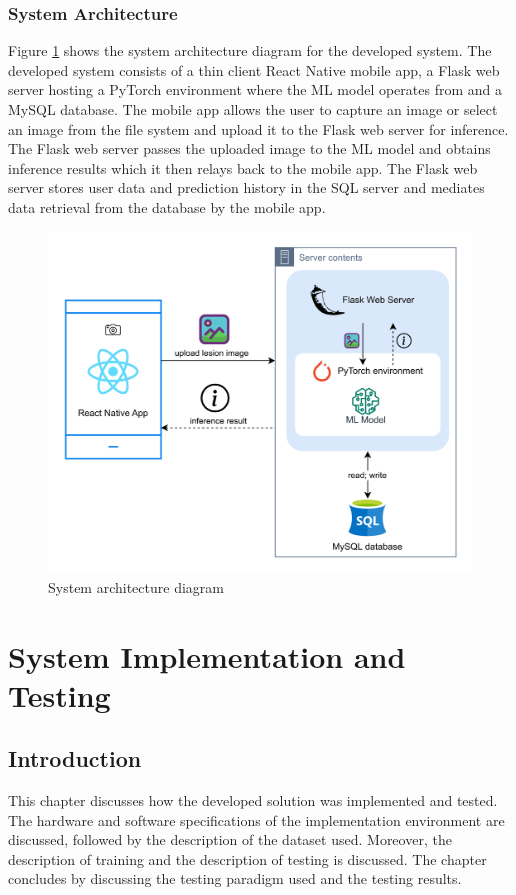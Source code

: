 \documentclass[12pt, a4paper]{article}
\begin{document}
\subsubsection{System Architecture}
Figure \ref{fig:arch-diagram} shows the system architecture diagram for the developed system. The developed system consists of a thin client React Native mobile app, a Flask web server hosting a PyTorch environment where the ML model operates from and a MySQL database. The mobile app allows the user to capture an image or select an image from the file system and upload it to the Flask web server for inference. The Flask web server passes the uploaded image to the ML model and obtains inference results which it then relays back to the mobile app. The Flask web server stores user data and prediction history in the SQL server and mediates data retrieval from the database by the mobile app.
\begin{figure}[h]
    \centering
    \setlength{\fboxsep}{8pt}
    \includegraphics[scale=0.12, fbox]{arch-diagram.png}
    \caption{System architecture diagram}
    \label{fig:arch-diagram}
\end{figure}
\clearpage
\section{System Implementation and Testing}
\subsection{Introduction}
This chapter discusses how the developed solution was implemented and tested. The hardware and software specifications of the implementation environment are discussed, followed by the description of the dataset used. Moreover, the description of training and the description of testing is discussed. The chapter concludes by discussing the testing paradigm used and the testing results.
\end{document}

